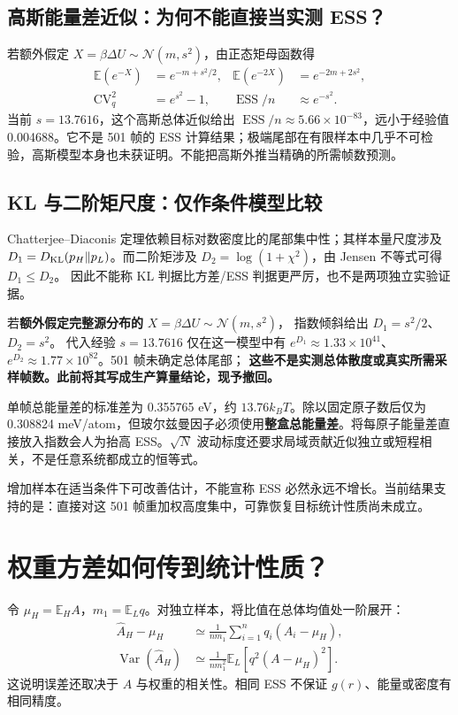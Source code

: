 \documentclass[11pt,a4paper]{article}
\newcommand{\E}{\mathbb E}\newcommand{\Var}{\operatorname{Var}}
\newcommand{\ESS}{\operatorname{ESS}}
\begin{document}
\subsection{高斯能量差近似：为何不能直接当实测 ESS？}
若额外假定 $X=\beta\Delta U\sim\mathcal N(m,s^2)$，由正态矩母函数得
\begin{align}
\E(e^{-X})&=e^{-m+s^2/2},&\E(e^{-2X})&=e^{-2m+2s^2},\\
\mathrm{CV}_q^2&=e^{s^2}-1,&\ESS/n&\approx e^{-s^2}.
\end{align}
当前 $s=13.7616$，这个高斯总体近似给出 $\ESS/n\approx5.66\times10^{-83}$，远小于经验值 0.004688。它不是 501 帧的 ESS 计算结果；极端尾部在有限样本中几乎不可检验，高斯模型本身也未获证明。不能把高斯外推当精确的所需帧数预测。

\subsection{KL 与二阶矩尺度：仅作条件模型比较}
Chatterjee--Diaconis 定理依赖目标对数密度比的尾部集中性；其样本量尺度涉及
$D_1=D_{\rm KL}(p_H\Vert p_L)$。而二阶矩涉及
$D_2=\log(1+\chi^2)$，由 Jensen 不等式可得 $D_1\le D_2$。
因此不能称 KL 判据比方差/ESS 判据更严厉，也不是两项独立实验证据。

若\textbf{额外假定完整源分布的} $X=\beta\Delta U\sim\mathcal N(m,s^2)$，
指数倾斜给出 $D_1=s^2/2$、$D_2=s^2$。
代入经验 $s=13.7616$ 仅在这一模型中有 $e^{D_1}\approx1.33\times10^{41}$、
$e^{D_2}\approx1.77\times10^{82}$。501 帧未确定总体尾部；
\textbf{这些不是实测总体散度或真实所需采样帧数。此前将其写成生产算量结论，现予撤回。}

单帧总能量差的标准差为 0.355765 eV，约 $13.76k_BT$。除以固定原子数后仅为 0.308824 meV/atom，但玻尔兹曼因子必须使用\textbf{整盒总能量差}。将每原子能量差直接放入指数会人为抬高 ESS。$\sqrt{N}$ 波动标度还要求局域贡献近似独立或短程相关，不是任意系统都成立的恒等式。

增加样本在适当条件下可改善估计，不能宣称 ESS 必然永远不增长。当前结果支持的是：直接对这 501 帧重加权高度集中，可靠恢复目标统计性质尚未成立。
\newpage
\section{权重方差如何传到统计性质？}
令 $\mu_H=\E_H A$，$m_1=\E_L q$。对独立样本，将比值在总体均值处一阶展开：
\begin{align}
\hat A_H-\mu_H
&\simeq\frac1{nm_1}\sum_{i=1}^nq_i(A_i-\mu_H),\\
\Var(\hat A_H)&\simeq\frac1{nm_1^2}\E_L[q^2(A-\mu_H)^2].
\end{align}
这说明误差还取决于 $A$ 与权重的相关性。相同 ESS 不保证 $g(r)$、能量或密度有相同精度。
\end{document}
